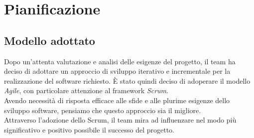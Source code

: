 
\section{Pianificazione}
\subsection{Modello adottato}
Dopo un'attenta valutazione e analisi delle esigenze del progetto, il team ha deciso di adottare un approccio di sviluppo iterativo e incrementale per la realizzazione del software richiesto. È stato quindi deciso di adoperare il modello \textit{Agile}, con particolare attenzione al framework \textit{Scrum}.\\
Avendo necessità di risposta efficace alle sfide e alle plurime esigenze dello sviluppo software, pensiamo che questo approccio sia il migliore.\\
Attraverso l'adozione dello Scrum, il team mira ad influenzare nel modo più significativo e positivo possibile il successo del progetto.

